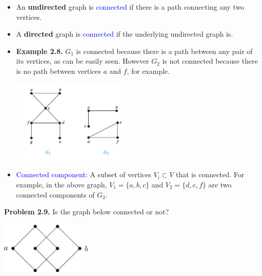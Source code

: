 \documentclass[aspectratio=169]{beamer}
\providecommand{\Blue}[1]{\textcolor{blue}{#1}}
\begin{document}
\begin{frame}[plain]{}
  \begin{itemize}
  \item An {\bf undirected} graph is \Blue{connected} if there is a path connecting any two vertices.
  \item A {\bf directed} graph is \Blue{connected} if the underlying undirected graph is. \pause 
  \item {\bf Example 2.8.} $G_1$ is connected because there is a path between
      any pair of its vertices, as can be easily seen. However $G_2$
      is not connected because there is no path between vertices
      $a$ and $f$, for example.
      \begin{center}
        \includegraphics[height=4cm]{./img/lecture2-fig7.png}
      \end{center}
   \item \Blue{Connected component}: A subset of vertices $V_i\subset V$ that is connected. For example, in the above graph,
    $V_1 = \{ a,b,c\}$ and $V_2=\{ d,e,f\}$ are two connected components of $G_2$.
  \end{itemize}
\end{frame}

\begin{frame}[plain]{}

 {\bf Problem 2.9.} Is the graph below connected or not?
    \begin{center}
        \includegraphics[height=2.5cm]{./img/lecture2-fig8.png}
      \end{center}
      
\end{frame}
\end{document}
